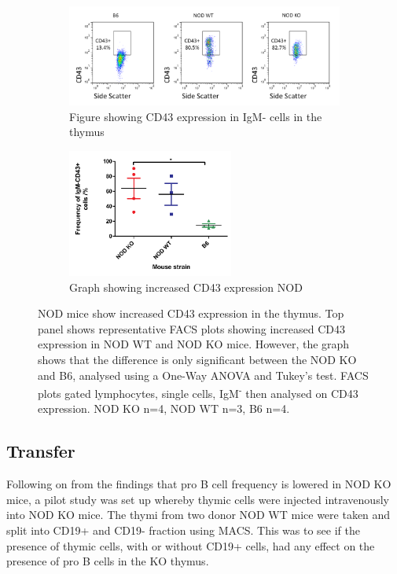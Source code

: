 \begin{figure}
	\begin{subfigure}{\textwidth}
	\includegraphics[width=\textwidth]{Figures/CD43expression.png}
	\caption{Figure showing CD43 expression in IgM- cells in the thymus}
	\end{subfigure}
	\begin{subfigure}{\textwidth}
	\centering
	\includegraphics[width=0.6\textwidth]{Figures/CD43levels.pdf}
	\caption{Graph showing increased CD43 expression NOD}
	\end{subfigure}
\caption{NOD mice show increased CD43 expression in the thymus.
Top panel shows representative FACS plots showing increased CD43 expression in NOD WT and NOD KO mice.
However, the graph shows that the difference is only significant between the NOD KO and B6, analysed using a One-Way ANOVA and Tukey's test.
FACS plots gated lymphocytes, single cells, IgM\textsuperscript{-} then analysed on CD43 expression.
NOD KO n=4, NOD WT n=3, B6 n=4. }
\label{fig:CD43expression}
\end{figure}


\subsection{Transfer}

Following on from the findings that pro B cell frequency is lowered in NOD KO mice, a pilot study was set up whereby thymic cells were injected intravenously into NOD KO mice.
The thymi from two donor NOD WT mice were taken and split into CD19+ and CD19- fraction using MACS.
This was to see if the presence of thymic cells, with or without CD19+ cells, had any effect on the presence of pro B cells in the KO thymus.

